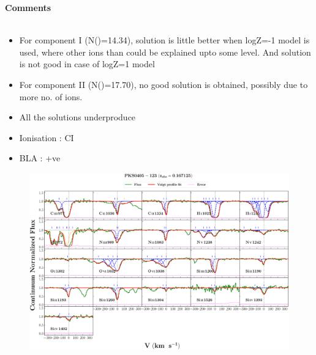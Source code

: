 \documentclass[12pt,draft]{report}
\newcommand\ion[2]{\text{#1\,\textsc{\lowercase{#2}}}}
\begin{document}
\newpage

\textbf{Comments}
\\\\
\begin{itemize}
    \item For component I (N(\ion{H}{i})=14.34), solution is little better when logZ=-1 model is used, where other ions than \ion{O}{vi} could be explained upto some level. And solution is not good in case of logZ=1 model
    \item For component II (N(\ion{H}{i})=17.70), no good solution is obtained, possibly due to more no. of ions. 
    \item All the solutions underproduce \ion{O}{vi}
    \item Ionisation : CI
    \item BLA : +ve
\end{itemize}





\newpage

\begin{landscape}

\begin{figure}
    \centering
    \vspace{-20mm}
    \hspace*{-35mm}
    \includegraphics[width=1.25\linewidth]{System-Plots/PKS0405-123_z=0.167125_sys_plot.png}
\end{figure}

\end{landscape}
\end{document}
